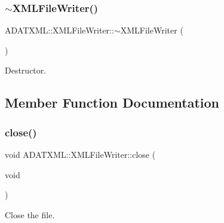 \subsubsection{\texorpdfstring{$\sim$XMLFileWriter()}{~XMLFileWriter()}\hspace{0.1cm}{\footnotesize\ttfamily [2/2]}}
{\footnotesize\ttfamily A\+D\+A\+T\+X\+M\+L\+::\+X\+M\+L\+File\+Writer\+::$\sim$\+X\+M\+L\+File\+Writer (\begin{DoxyParamCaption}{ }\end{DoxyParamCaption})}



Destructor. 



\subsection{Member Function Documentation}
\mbox{\label{classADATXML_1_1XMLFileWriter_a1a51ceb51781ac6f3a476dcf99a75017}} 
\subsubsection{\texorpdfstring{close()}{close()}\hspace{0.1cm}{\footnotesize\ttfamily [1/2]}}
{\footnotesize\ttfamily void A\+D\+A\+T\+X\+M\+L\+::\+X\+M\+L\+File\+Writer\+::close (\begin{DoxyParamCaption}\item[{void}]{ }\end{DoxyParamCaption})}



Close the file. 

